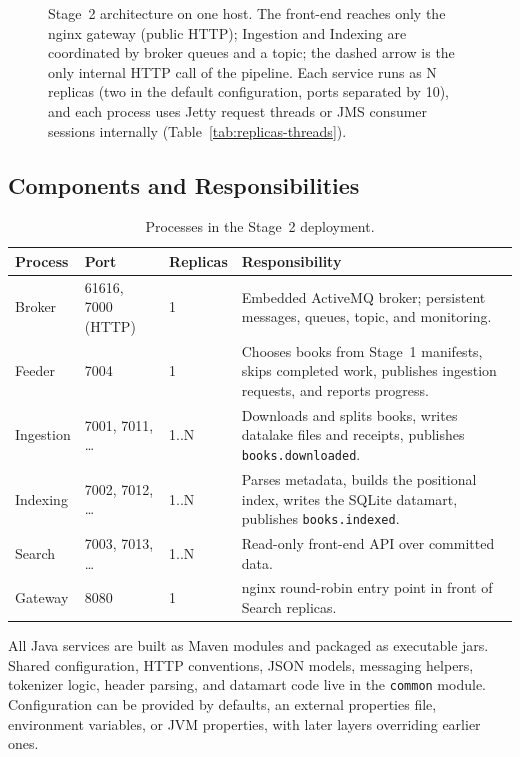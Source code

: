 \documentclass[12pt,a4paper]{article}
\begin{document}
\begin{figure}[H]
	\caption{Stage~2 architecture on one host. The front-end reaches only the nginx gateway (public
		HTTP); Ingestion and Indexing are coordinated by broker queues and a topic; the dashed arrow is
		the only internal HTTP call of the pipeline. Each service runs as N replicas (two in the default
		configuration, ports separated by 10), and each process uses Jetty request threads or JMS
		consumer sessions internally (Table~\ref{tab:replicas-threads}).}
	\label{fig:stage2-architecture}
\end{figure}

\subsection{Components and Responsibilities}

\begin{table}[H]
    \centering
    \caption{Processes in the Stage~2 deployment.}
    \label{tab:components}
    \small
    \begin{tabularx}{\textwidth}{p{} p{} p{} X}
        \toprule
        \textbf{Process} & \textbf{Port} & \textbf{Replicas} & \textbf{Responsibility} \\
        \midrule
        Broker & 61616, 7000 (HTTP) & 1 & Embedded ActiveMQ broker; persistent messages, queues, topic, and monitoring. \\
        Feeder & 7004 & 1 & Chooses books from Stage~1 manifests, skips completed work, publishes ingestion requests, and reports progress. \\
        Ingestion & 7001, 7011, \ldots & 1..N & Downloads and splits books, writes datalake files and receipts, publishes \texttt{books.downloaded}. \\
        Indexing & 7002, 7012, \ldots & 1..N & Parses metadata, builds the positional index, writes the SQLite datamart, publishes \texttt{books.indexed}. \\
        Search & 7003, 7013, \ldots & 1..N & Read-only front-end API over committed data. \\
        Gateway & 8080 & 1 & nginx round-robin entry point in front of Search replicas. \\
        \bottomrule
    \end{tabularx}
\end{table}

All Java services are built as Maven modules and packaged as executable jars. Shared configuration,
HTTP conventions, JSON models, messaging helpers, tokenizer logic, header parsing, and datamart
code live in the \texttt{common} module. Configuration can be provided by defaults, an external
properties file, environment variables, or JVM properties, with later layers overriding earlier
ones.
\end{document}
